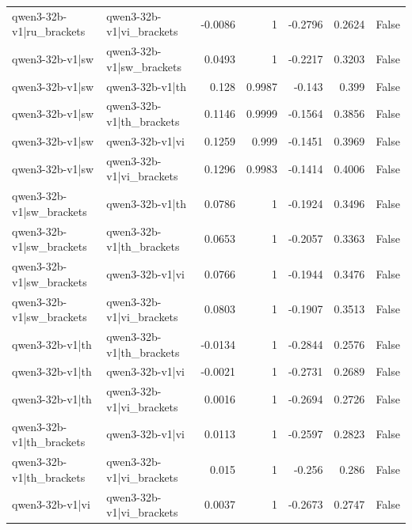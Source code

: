 \begin{table}
\begin{tabular}{l l r r r r l}
qwen3-32b-v1|ru_brackets & qwen3-32b-v1|vi_brackets & -0.0086 & 1 & -0.2796 & 0.2624 & False \\
qwen3-32b-v1|sw & qwen3-32b-v1|sw_brackets & 0.0493 & 1 & -0.2217 & 0.3203 & False \\
qwen3-32b-v1|sw & qwen3-32b-v1|th & 0.128 & 0.9987 & -0.143 & 0.399 & False \\
qwen3-32b-v1|sw & qwen3-32b-v1|th_brackets & 0.1146 & 0.9999 & -0.1564 & 0.3856 & False \\
qwen3-32b-v1|sw & qwen3-32b-v1|vi & 0.1259 & 0.999 & -0.1451 & 0.3969 & False \\
qwen3-32b-v1|sw & qwen3-32b-v1|vi_brackets & 0.1296 & 0.9983 & -0.1414 & 0.4006 & False \\
qwen3-32b-v1|sw_brackets & qwen3-32b-v1|th & 0.0786 & 1 & -0.1924 & 0.3496 & False \\
qwen3-32b-v1|sw_brackets & qwen3-32b-v1|th_brackets & 0.0653 & 1 & -0.2057 & 0.3363 & False \\
qwen3-32b-v1|sw_brackets & qwen3-32b-v1|vi & 0.0766 & 1 & -0.1944 & 0.3476 & False \\
qwen3-32b-v1|sw_brackets & qwen3-32b-v1|vi_brackets & 0.0803 & 1 & -0.1907 & 0.3513 & False \\
qwen3-32b-v1|th & qwen3-32b-v1|th_brackets & -0.0134 & 1 & -0.2844 & 0.2576 & False \\
qwen3-32b-v1|th & qwen3-32b-v1|vi & -0.0021 & 1 & -0.2731 & 0.2689 & False \\
qwen3-32b-v1|th & qwen3-32b-v1|vi_brackets & 0.0016 & 1 & -0.2694 & 0.2726 & False \\
qwen3-32b-v1|th_brackets & qwen3-32b-v1|vi & 0.0113 & 1 & -0.2597 & 0.2823 & False \\
qwen3-32b-v1|th_brackets & qwen3-32b-v1|vi_brackets & 0.015 & 1 & -0.256 & 0.286 & False \\
qwen3-32b-v1|vi & qwen3-32b-v1|vi_brackets & 0.0037 & 1 & -0.2673 & 0.2747 & False \\
\bottomrule
\end{tabular}
\end{table}
